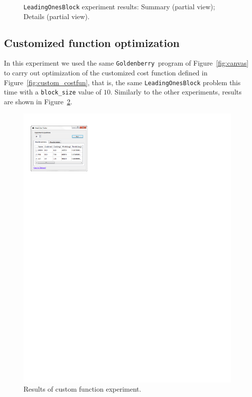 \documentclass{sig-alternate}
\newcommand{\GB}{\texttt{Goldenberry}}
\newcommand{\figref}[1]{\mbox{Figure \ref{#1}}}
\begin{document}
\begin{figure}[H]
{	\label{fig:onesblock2}}
	\caption{\texttt{LeadingOnesBlock} experiment results:  Summary (partial view);  Details  (partial view).}
	\label{fig:onesblock}
\end{figure}


\subsection{Customized function optimization}
In this experiment we used the same \GB~program of \figref{fig:canvas} to carry out optimization of the customized cost function defined in \figref{fig:custom_costfun}, that is, the same \texttt{Leading\-OnesBlock} problem this time with a \texttt{block\_size} value of $10$. Similarly to the other experiments, results are shown in \figref{fig:custom}. 

\begin{figure}[H]
	\centering
	\includegraphics[scale=1]{custom_bbsummary} 
	\caption{Results of custom function experiment.}
	\label{fig:custom}
\end{figure}
\end{document}
